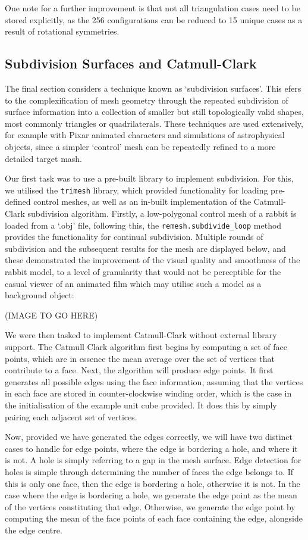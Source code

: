 \documentclass[10pt,a4paper]{article}
\begin{document}
One note for a further improvement is that not all triangulation cases need to be stored explicitly, as the 256 configurations can be reduced to 15 unique cases as a result of rotational symmetries. 


\subsection{Subdivision Surfaces and Catmull-Clark} 

The final section considers a technique known as ‘subdivision surfaces’. This efers to the complexification of mesh geometry through the repeated subdivision of surface information into a collection of smaller but still topologically valid shapes, most commonly triangles or quadrilaterals. These techniques are used extensively, for example with Pixar animated characters and simulations of astrophysical objects, since a simpler ‘control’ mesh can be repeatedly refined to a more detailed target mash.

Our first task was to use a pre-built library to implement subdivision. For this, we utilised the \texttt{trimesh} library, which provided functionality for loading pre-defined control meshes, as well as an in-built implementation of the Catmull-Clark subdivision algorithm. Firstly, a low-polygonal control mesh of a rabbit is loaded from a ‘.obj’ file, following this, the \texttt{remesh.subdivide\_loop} method provides the functionality for continual subdivision. Multiple rounds of subdivision and the subsequent results for the mesh are displayed below, and these demonstrated the improvement of the visual quality and smoothness of the rabbit model, to a level of granularity that would not be perceptible for the casual viewer of an animated film which may utilise such a model as a background object:

(IMAGE TO GO HERE)

We were then tasked to implement Catmull-Clark without external library support. The Catmull Clark algorithm first begins by computing a set of face points, which are in essence the mean average over the set of vertices that contribute to a face. Next, the algorithm will produce edge points. It first generates all possible edges using the face information, assuming that the vertices in each face are stored in counter-clockwise winding order, which is the case in the initialisation of the example unit cube provided. It does this by simply pairing each adjacent set of vertices.

Now, provided we have generated the edges correctly, we will have two distinct cases to handle for edge points, where the edge is bordering a hole, and where it is not. A hole is simply referring to a gap in the mesh surface. Edge detection for holes is simple through determining the number of faces the edge belongs to. If this is only one face, then the edge is bordering a hole, otherwise it is not. In the case where the edge is bordering a hole, we generate the edge point as the mean of the vertices constituting that edge. Otherwise, we generate the edge point by computing the mean of the face points of each face containing the edge, alongside the edge centre.
\end{document}
